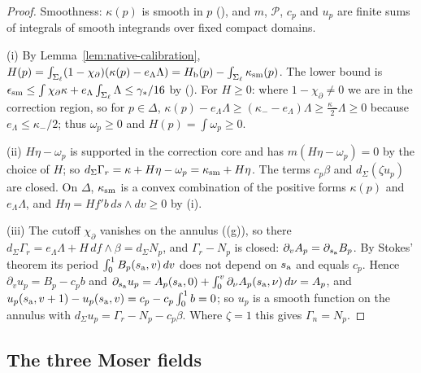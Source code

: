 \begin{proof}
Smoothness: $\kappa(p)$ is smooth in $p$ (), and $m$, $\mathcal P$, $c_p$ and $u_p$ are finite sums of
integrals of smooth integrands over fixed compact domains.

(i) By Lemma~\ref{lem:native-calibration}, $H(p)=\int_{\Sigma_\ell}(1-\chi_\partial)(\kappa(p)-e_\Lambda\Lambda)=H_{\mathrm b}(p)-\int_{\Sigma_\ell}\kappa_{\rm sm}(p)$.
The lower bound is $\epsilon_{\rm sm}\le\int\chi_\partial\kappa+e_\Lambda\int_{\Sigma_\ell}\Lambda\le\gamma_*/16$ by (). For $H\ge0$: where $1-\chi_\partial\ne0$ we are in the correction region, so for $p\in\Delta$,
$\kappa(p)-e_\Lambda\Lambda\ge(\kappa_--e_\Lambda)\Lambda\ge\frac{\kappa_-}2\Lambda\ge0$ because $e_\Lambda\le\kappa_-/2$; thus $\omega_p\ge0$ and
$H(p)=\int\omega_p\ge0$.

(ii) $H\eta-\omega_p$ is supported in the correction core and has $m(H\eta-\omega_p)=0$ by the choice of $H$; so
$d_\Sigma\Gamma_r=\kappa+H\eta-\omega_p=\kappa_{\rm sm}+H\eta$. The terms $c_p\beta$ and $d_\Sigma(\zeta u_p)$ are closed. On
$\Delta$, $\kappa_{\rm sm}$ is a convex combination of the positive forms $\kappa(p)$ and $e_\Lambda\Lambda$, and $H\eta=Hf'b\,ds\wedge dv\ge0$
by (i).

(iii) The cutoff $\chi_\partial$ vanishes on the annulus ((g)), so there
$d_\Sigma\Gamma_r=e_\Lambda\Lambda+H\,df\wedge\beta=d_\Sigma N_p$, and $\Gamma_r-N_p$ is closed: $\partial_vA_p=\partial_{s_{\rm a}}B_p$. By Stokes'
theorem its period $\int_0^1B_p(s_{\rm a},v)\,dv$ does not depend on $s_{\rm a}$ and equals $c_p$. Hence
$\partial_vu_p=B_p-c_pb$ and $\partial_{s_{\rm a}}u_p=A_p(s_{\rm a},0)+\int_0^v\partial_\nu A_p(s_{\rm a},\nu)\,d\nu=A_p$, and
$u_p(s_{\rm a},v+1)-u_p(s_{\rm a},v)=c_p-c_p\int_0^1b=0$; so $u_p$ is a smooth function on the annulus with
$d_\Sigma u_p=\Gamma_r-N_p-c_p\beta$. Where $\zeta=1$ this gives $\Gamma_n=N_p$.
\end{proof}

\subsection{The three Moser fields}


